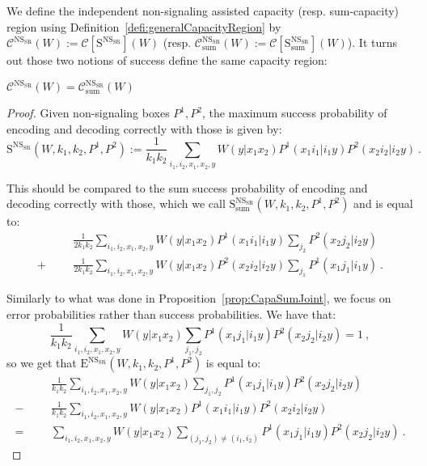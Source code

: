 We define the independent non-signaling assisted capacity (resp. sum-capacity) region using Definition~\ref{defi:generalCapacityRegion} by $\mathcal{C}^{\mathrm{NS}_{\mathrm{SR}}}(W) := \mathcal{C}[\mathrm{S}^{\mathrm{NS}_{\mathrm{SR}}}](W)$ (resp. $\mathcal{C}_{\text{sum}}^{\mathrm{NS}_{\mathrm{SR}}}(W) := \mathcal{C}[\mathrm{S}_{\text{sum}}^{\mathrm{NS}_{\mathrm{SR}}}](W)$). It turns out those two notions of success define the same capacity region:
\begin{proposition}
  \label{prop:NSCapaSumJoint}
  $\mathcal{C}^{\mathrm{NS}_{\mathrm{SR}}}(W) = \mathcal{C}_{\text{sum}}^{\mathrm{NS}_{\mathrm{SR}}}(W)$
\end{proposition}
\begin{proof}
  Given non-signaling boxes $P^1,P^2$, the maximum success probability of encoding and decoding correctly with those is given by:
\[ \mathrm{S}^{\mathrm{NS}_{\mathrm{SR}}}(W,k_1,k_2,P^1,P^2) := \frac{1}{k_1k_2} \sum_{i_1,i_2,x_1,x_2,y} W(y|x_1x_2)P^1(x_1i_1|i_1y)P^2(x_2i_2|i_2y) \ . \]

This should be compared to the sum success probability of encoding and decoding correctly with those, which we call $\mathrm{S}_{\text{sum}}^{\mathrm{NS}_{\mathrm{SR}}}(W,k_1,k_2,P^1,P^2)$ and is equal to:
\begin{equation}
  \begin{aligned}
    &&&\frac{1}{2k_1k_2} \sum_{i_1,i_2,x_1,x_2,y} W(y|x_1x_2)P^1(x_1i_1|i_1y)\sum_{j_2}P^2(x_2j_2|i_2y)\\
    + &&&\frac{1}{2k_1k_2} \sum_{i_1,i_2,x_1,x_2,y} W(y|x_1x_2)P^2(x_2i_2|i_2y)\sum_{j_1}P^1(x_1j_1|i_1y) \ .
  \end{aligned}
\end{equation}

Similarly to what was done in Proposition~\ref{prop:CapaSumJoint}, we focus on error probabilities rather than success probabilities. We have that:
\[ \frac{1}{k_1k_2}\sum_{i_1,i_2,x_1,x_2,y}W(y|x_1x_2)\sum_{j_1,j_2}P^1(x_1j_1|i_1y)P^2(x_2j_2|i_2y) = 1 \ ,\]
so we get that $\mathrm{E}^{\mathrm{NS}_{\mathrm{SR}}}(W,k_1,k_2,P^1,P^2)$ is equal to:
\begin{equation}
  \begin{aligned}
    &&&\frac{1}{k_1k_2} \sum_{i_1,i_2,x_1,x_2,y} W(y|x_1x_2)\sum_{j_1,j_2}P^1(x_1j_1|i_1y)P^2(x_2j_2|i_2y)\\
    - &&&\frac{1}{k_1k_2} \sum_{i_1,i_2,x_1,x_2,y} W(y|x_1x_2)P^1(x_1i_1|i_1y)P^2(x_2i_2|i_2y)\\
      = &&& \sum_{i_1,i_2,x_1,x_2,y} W(y|x_1x_2)\sum_{(j_1,j_2) \not= (i_1,i_2)}P^1(x_1j_1|i_1y)P^2(x_2j_2|i_2y) \ .
  \end{aligned}
\end{equation}


\end{proof}
